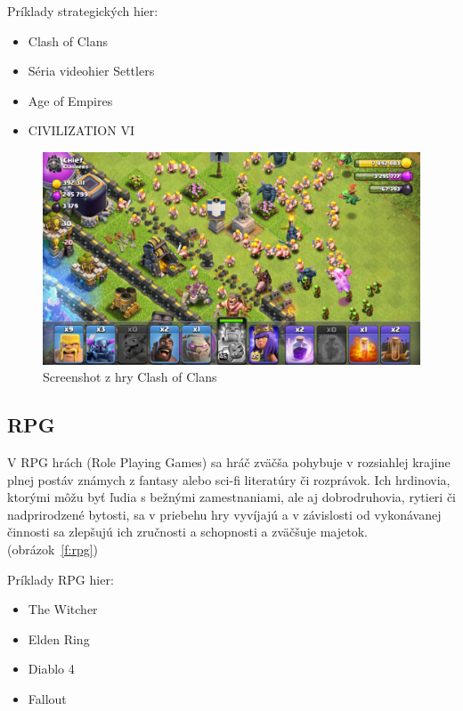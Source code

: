 \documentclass[10pt,oneside,slovak,a4paper]{article}
\begin{document}
Príklady strategických hier:
\begin{itemize}
\item Clash of Clans
\item Séria videohier Settlers
\item Age of Empires
\item CIVILIZATION VI
\end{itemize}

\begin{figure}[tbh]
\centering
\includegraphics[scale=0.20]{coc.jpg}
\caption{Screenshot z hry Clash of Clans}
\label{f:coc}
\end{figure}

\subsection{RPG} \label{zanre:rpg}

V RPG hrách (Role Playing Games) sa hráč zväčša pohybuje v rozsiahlej krajine plnej postáv známych z fantasy alebo sci-fi literatúry či rozprávok. Ich hrdinovia, ktorými môžu byť ľudia s bežnými  zamestnaniami, ale aj dobrodruhovia, rytieri či nadprirodzené bytosti, sa v priebehu hry vyvíjajú a v závislosti od vykonávanej činnosti sa zlepšujú ich zručnosti a schopnosti a zväčšuje majetok.(obrázok~\ref{f:rpg})

Príklady RPG hier:
\begin{itemize}
\item The Witcher
\item Elden Ring
\item Diablo 4
\item Fallout
\end{itemize}
\end{document}
